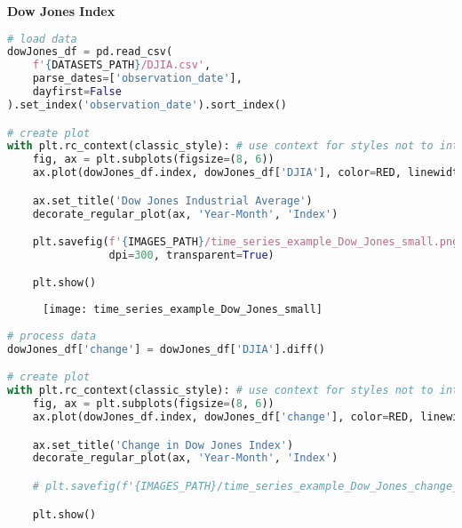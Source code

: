 {\noindent\hspace{-12.5pt}\normalsize\bfseries Dow Jones Index}\vspace{-10pt}
\begin{center}
  \begin{lstlisting}[language=Python, 
  caption={Промышленный индекс Доу Джонса.}, 
  label={lst:time_series_example_Dow_Jones_small}]
# load data
dowJones_df = pd.read_csv(
    f'{DATASETS_PATH}/DJIA.csv',
    parse_dates=['observation_date'],
    dayfirst=False
).set_index('observation_date').sort_index()

# create plot
with plt.rc_context(classic_style): # use context for styles not to interfere
    fig, ax = plt.subplots(figsize=(8, 6))
    ax.plot(dowJones_df.index, dowJones_df['DJIA'], color=RED, linewidth=1.5)

    ax.set_title('Dow Jones Industrial Average')
    decorate_regular_plot(ax, 'Year-Month', 'Index')

    plt.savefig(f'{IMAGES_PATH}/time_series_example_Dow_Jones_small.png', 
                dpi=300, transparent=True)

    plt.show()
  \end{lstlisting}
\end{center}

\begin{figure}[h!]
  \centering
  \texttt{[image: time\_series\_example\_Dow\_Jones\_small]}
\end{figure}\newpage


\begin{center}
  \begin{lstlisting}[language=Python, 
  caption={Изменение в индексе Доу Джонса.}, 
  label={lst:time_series_example_Dow_Jones_change_small}]
# process data
dowJones_df['change'] = dowJones_df['DJIA'].diff()

# create plot
with plt.rc_context(classic_style): # use context for styles not to interfere
    fig, ax = plt.subplots(figsize=(8, 6))
    ax.plot(dowJones_df.index, dowJones_df['change'], color=RED, linewidth=1.5)

    ax.set_title('Change in Dow Jones Index')
    decorate_regular_plot(ax, 'Year-Month', 'Index')

    # plt.savefig(f'{IMAGES_PATH}/time_series_example_Dow_Jones_change_small.png', dpi=300, transparent=True)

    plt.show()
  \end{lstlisting}
\end{center}

